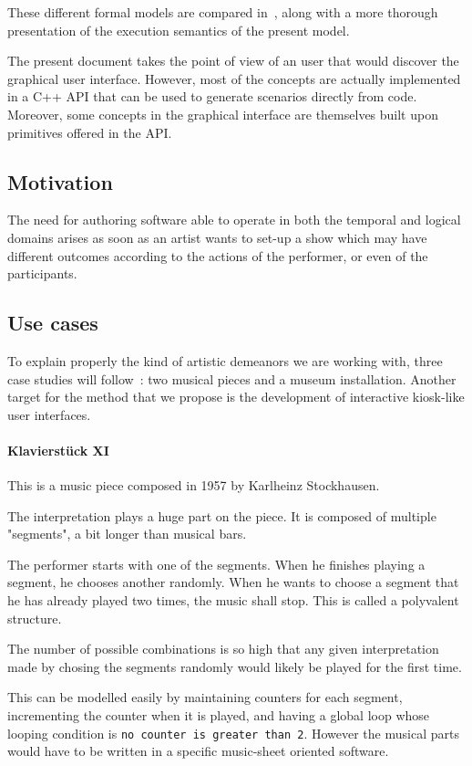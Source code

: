 \documentclass{sigchi}
\begin{document}
These different formal models are compared in~\cite{celerier2015ossia}, along with a more thorough presentation of the execution semantics of the present model.

The present document takes the point of view of an user that would discover the graphical user interface. However, most of the concepts are actually implemented in a C++ API\cite{hogue2014ossia} that can be used to generate scenarios directly from code. Moreover, some concepts in the graphical interface are themselves built upon primitives offered in the API.

\subsection{Motivation}
The need for authoring software able to operate in both the temporal and logical domains arises as soon as an artist wants to set-up a show which may have different outcomes according to the actions of the performer, or even of the participants.

\subsection{Use cases}
To explain properly the kind of artistic demeanors we are working with, three case studies will follow~: two musical pieces and a museum installation. Another target for the method that we propose is the development of interactive kiosk-like user interfaces.

\paragraph{Klavierst\"uck XI}
This is a music piece composed in 1957 by Karlheinz Stockhausen.

The interpretation plays a huge part on the piece. It is composed of multiple "segments", a bit longer than musical bars.

The performer starts with one of the segments. When he finishes playing a segment, he chooses another randomly. When he wants to choose a segment that he has already played two times, the music shall stop. This is called a polyvalent structure.

The number of possible combinations is so high that any given interpretation made by chosing the segments randomly would likely be played for the first time.

This can be modelled easily by maintaining counters for each segment, incrementing the counter when it is played, and having a global loop whose looping condition is \texttt{no counter is greater than 2}. However the musical parts would have to be written in a specific music-sheet oriented software.
\end{document}
